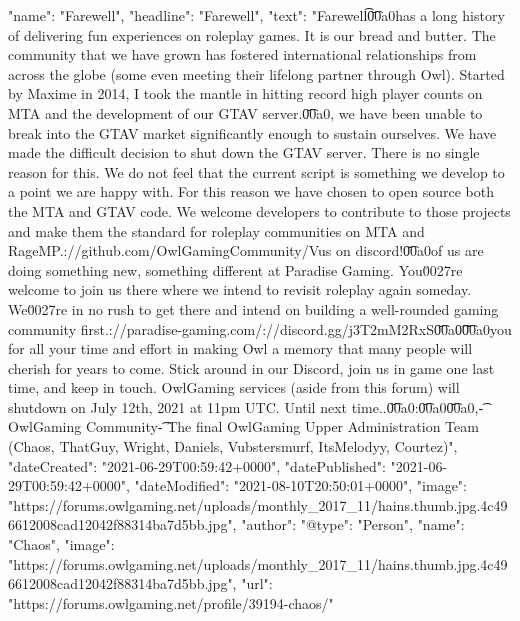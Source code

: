 {
    "name": "Farewell",
    "headline": "Farewell",
    "text": "Farewell\n\t \n\n\n\n\t\u00a0\n \n\n\n\tOwlGaming has a long history of delivering fun experiences on roleplay games. It is our bread and butter. The community that we have grown has fostered international relationships from across the globe (some even meeting their lifelong partner through Owl). Started by Maxime in 2014, I took the mantle in hitting record high player counts on MTA and the development of our GTAV server.\n \n\n\n\t\u00a0\n \n\n\n\tUnfortunately, we have been unable to break into the GTAV market significantly enough to sustain ourselves. We have made the difficult decision to shut down the GTAV server. There is no single reason for this. We do not feel that the current script is something we develop to a point we are happy with. For this reason we have chosen to open source both the MTA and GTAV code. We welcome developers to contribute to those projects and make them the standard for roleplay communities on MTA and RageMP.\n \n\n\n\thttps://github.com/OwlGamingCommunity/V\n \n\n\n\tJoin us on discord!\n \n\n\n\t\u00a0\n \n\n\n\tSome of us are doing something new, something different at Paradise Gaming. You\u0027re welcome to join us there where we intend to revisit roleplay again someday. We\u0027re in no rush to get there and intend on building a well-rounded gaming community first.\n \n\n\n\thttps://paradise-gaming.com/\n \n\n\n\thttps://discord.gg/j3T2mM2RxS\n \n\n\n\t\u00a0\n \n\n\n\t \n\n\n\t\u00a0\n \n\n\n\tThank you for all your time and effort in making Owl a memory that many people will cherish for years to come. Stick around in our Discord, join us in game one last time, and keep in touch. OwlGaming services (aside from this forum) will shutdown on July 12th, 2021 at 11pm UTC. Until next time..\n \n\n\n\t\u00a0\n \n\n\n\tStats:\n \n\n\n\t\u00a0\n \n\n\n\n\n\t\u00a0\n \n\n\n\tRegards,\n \n\n\n\t- OwlGaming Community\n \n\n\n\t- The final OwlGaming Upper Administration Team (Chaos, ThatGuy, Wright, Daniels, Vubstersmurf, ItsMelodyy, Courtez)\n \n",
    "dateCreated": "2021-06-29T00:59:42+0000",
    "datePublished": "2021-06-29T00:59:42+0000",
    "dateModified": "2021-08-10T20:50:01+0000",
    "image": "https://forums.owlgaming.net/uploads/monthly_2017_11/hains.thumb.jpg.4c496612008cad12042f88314ba7d5bb.jpg",
    "author": {
        "@type": "Person",
        "name": "Chaos",
        "image": "https://forums.owlgaming.net/uploads/monthly_2017_11/hains.thumb.jpg.4c496612008cad12042f88314ba7d5bb.jpg",
        "url": "https://forums.owlgaming.net/profile/39194-chaos/"
}}
